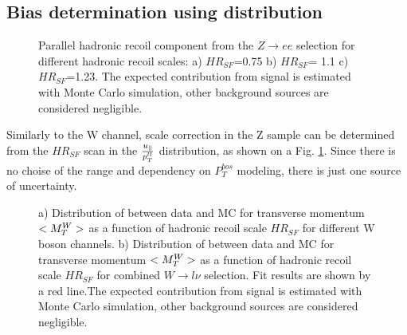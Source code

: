 \subsection{Bias determination using \upar distribution}




\begin{figure}[!tbp]
\endminipage\hfill
{}
\endminipage\hfill
{}%
\endminipage
\caption{Parallel hadronic recoil component \upar from the $Z\to ee$ selection for different hadronic recoil scales: a) $HR_{SF}$=0.75 b) $HR_{SF}$= 1.1 c) $HR_{SF}$=1.23. The expected contribution from signal is estimated with Monte Carlo simulation, other background sources are considered negligible.}
\label{HadrRecoil:ZScan}
\end{figure}
 
Similarly to the W channel, scale correction in the Z sample can be determined from the $HR_{SF}$ scan in the $\frac{u_{\parallel}}{p_T^{ll}}$ distribution, as shown on a Fig. \ref{HadrRecoil:ZScan}. 
Since there is no choise of the range and dependency on $P_T^{bos}$ modeling, there is just one source of uncertainty.


\begin{figure}[!tbp]
\begin{minipage}[h]{0.49\linewidth}
\end{minipage}
\hfill
\begin{minipage}[h]{0.49\linewidth}
\end{minipage}
\caption{a) Distribution of \chiD  between data and MC for transverse momentum $<M_T^W>$ as a function of hadronic recoil scale $HR_{SF}$ for different W boson channels. 
b) Distribution of \chiD  between data and MC for transverse momentum $<M_T^W>$ as a function of hadronic recoil scale $HR_{SF}$ for combined $W \to l \nu$ selection. Fit results are shown by a red line.The expected contribution from signal is estimated with Monte Carlo simulation, other background sources are considered negligible.}
\label{uPAr}
\end{figure}  
  
